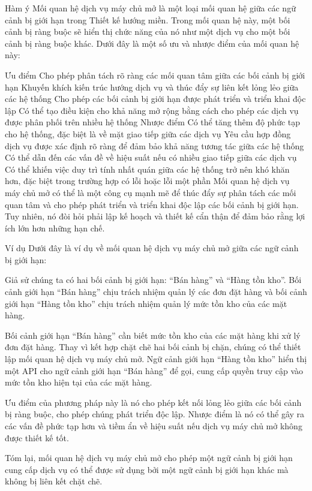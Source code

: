 Hàm ý
Mối quan hệ dịch vụ máy chủ mở là một loại mối quan hệ giữa các ngữ cảnh bị giới hạn trong Thiết kế hướng miền. Trong mối quan hệ này, một bối cảnh bị ràng buộc sẽ hiển thị chức năng của nó như một dịch vụ cho một bối cảnh bị ràng buộc khác. Dưới đây là một số ưu và nhược điểm của mối quan hệ này:

Ưu điểm
Cho phép phân tách rõ ràng các mối quan tâm giữa các bối cảnh bị giới hạn
Khuyến khích kiến ​​trúc hướng dịch vụ và thúc đẩy sự liên kết lỏng lẻo giữa các hệ thống
Cho phép các bối cảnh bị giới hạn được phát triển và triển khai độc lập
Có thể tạo điều kiện cho khả năng mở rộng bằng cách cho phép các dịch vụ được phân phối trên nhiều hệ thống
Nhược điểm
Có thể tăng thêm độ phức tạp cho hệ thống, đặc biệt là về mặt giao tiếp giữa các dịch vụ
Yêu cầu hợp đồng dịch vụ được xác định rõ ràng để đảm bảo khả năng tương tác giữa các hệ thống
Có thể dẫn đến các vấn đề về hiệu suất nếu có nhiều giao tiếp giữa các dịch vụ
Có thể khiến việc duy trì tính nhất quán giữa các hệ thống trở nên khó khăn hơn, đặc biệt trong trường hợp có lỗi hoặc lỗi một phần
Mối quan hệ dịch vụ máy chủ mở có thể là một công cụ mạnh mẽ để thúc đẩy sự phân tách các mối quan tâm và cho phép phát triển và triển khai độc lập các bối cảnh bị giới hạn. Tuy nhiên, nó đòi hỏi phải lập kế hoạch và thiết kế cẩn thận để đảm bảo rằng lợi ích lớn hơn những hạn chế.

Ví dụ
Dưới đây là ví dụ về mối quan hệ dịch vụ máy chủ mở giữa các ngữ cảnh bị giới hạn:

Giả sử chúng ta có hai bối cảnh bị giới hạn: “Bán hàng” và “Hàng tồn kho”. Bối cảnh giới hạn “Bán hàng” chịu trách nhiệm quản lý các đơn đặt hàng và bối cảnh giới hạn “Hàng tồn kho” chịu trách nhiệm quản lý mức tồn kho của các mặt hàng.

Bối cảnh giới hạn “Bán hàng” cần biết mức tồn kho của các mặt hàng khi xử lý đơn đặt hàng. Thay vì kết hợp chặt chẽ hai bối cảnh bị chặn, chúng có thể thiết lập mối quan hệ dịch vụ máy chủ mở. Ngữ cảnh giới hạn “Hàng tồn kho” hiển thị một API cho ngữ cảnh giới hạn “Bán hàng” để gọi, cung cấp quyền truy cập vào mức tồn kho hiện tại của các mặt hàng.

Ưu điểm của phương pháp này là nó cho phép kết nối lỏng lẻo giữa các bối cảnh bị ràng buộc, cho phép chúng phát triển độc lập. Nhược điểm là nó có thể gây ra các vấn đề phức tạp hơn và tiềm ẩn về hiệu suất nếu dịch vụ máy chủ mở không được thiết kế tốt.

Tóm lại, mối quan hệ dịch vụ máy chủ mở cho phép một ngữ cảnh bị giới hạn cung cấp dịch vụ có thể được sử dụng bởi một ngữ cảnh bị giới hạn khác mà không bị liên kết chặt chẽ.

